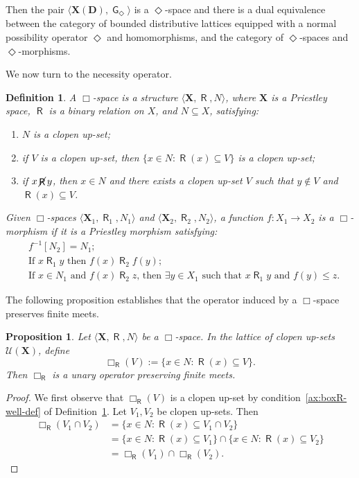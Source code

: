 \documentclass{article}
\newtheorem{proposition}[theorem]{Proposition}
\newtheorem{definition}[theorem]{Definition}
\DeclareMathOperator{\G}{\mathsf{G}}
\DeclareMathOperator{\R}{\mathsf{R}}
\DeclareMathOperator{\notR}{\cancel{ \R}}
\newcommand{\D}{\mathbf{D}}
\newcommand{\X}{\mathbf{X}}
\newcommand{\U}{\mathcal{U}}
\begin{document}
Then the pair $\langle \X(\D),\G_\Diamond\rangle$ is a $\Diamond$-space and there is a dual equivalence between the category of bounded distributive lattices equipped with a normal possibility operator $\Diamond$ and homomorphisms, and the category of $\Diamond$-spaces and $\Diamond$-morphisms.

We now turn to the necessity operator.

\begin{definition}
\label{def:box-space}
A \emph{$\Box$-space} is a structure $\langle \X, \R, N \rangle$, where $\X$ is a Priestley space, $\R$ is a binary relation on $X$, and $N \subseteq X$, satisfying:
\begin{enumerate}
    \item \label{ax:N-clopen} $N$ is a clopen up-set;
    \item \label{ax:boxR-well-def} if $V$ is a clopen up-set, then $\{x \in N : \R(x) \subseteq V\}$ is a clopen up-set;
    \item \label{ax:boxR-epsilon} if $x\notR y$, then $x \in N$ and there exists a clopen up-set $V$ such that $y \notin V$ and $\R(x) \subseteq V$.
\end{enumerate}

Given $\Box$-spaces $\langle \X_1, \R_1, N_1 \rangle$ and $\langle \X_2, \R_2, N_2 \rangle$, a function
$f \colon X_1 \to X_2$ is a \emph{$\Box$-morphism} if it is a Priestley morphism satisfying:
\begin{align}
    &f^{-1}[N_2] = N_1; \tag{BN}\label{ax:box-morph-N}\\
    &\text{If }x\R_1 y \text{ then } f(x)\R_2 f(y); \tag{BR1}\label{ax:box-morph1}\\
    &\text{If }x \in N_1 \text{ and } f(x)\R_2 z \text{, then } \exists y \in X_1 \text{ such that }x\R_1 y\text{ and } f(y) \leq z. \tag{BR2}\label{ax:box-morph2}
\end{align}
\end{definition}

The following proposition establishes that the operator induced by a $\Box$-space preserves finite meets.

\begin{proposition}
\label{prop:box-R-meet-preserving}
Let $\langle \X, \R, N \rangle$ be a $\Box$-space. In the lattice of clopen up-sets $\U(\X)$, define
\[
\Box_{\R}(V) := \{x \in N : \R(x) \subseteq V\}.
\]
Then $\Box_{\R}$ is a unary operator preserving finite meets.
\end{proposition}
\begin{proof}
We first observe that $\Box_{\R}(V)$ is a clopen up-set by condition~\ref{ax:boxR-well-def} of Definition~\ref{def:box-space}. Let $V_1, V_2$ be clopen up-sets. Then
\begin{align*}
\Box_{\R}(V_1 \cap V_2)
&= \{x \in N : \R(x) \subseteq V_1 \cap V_2\} \\
&=\{x \in N : \R(x) \subseteq V_1\} \cap \{x \in N : \R(x) \subseteq V_2\} \\
&= \Box_{\R}(V_1) \cap \Box_{\R}(V_2).
\end{align*}
\end{proof}
\end{document}
